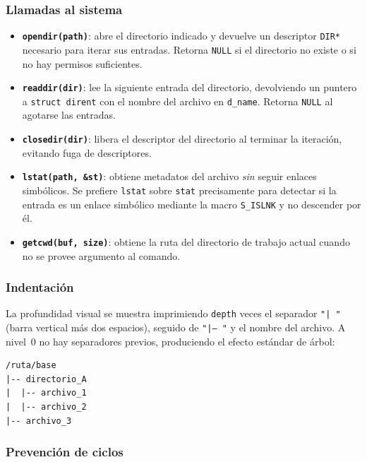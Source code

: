 \documentclass[11pt,a4paper]{article}
\begin{document}
\subsubsection*{Llamadas al sistema}

\begin{itemize}[leftmargin=*]
  \item \textbf{\texttt{opendir(path)}}: abre el directorio indicado y devuelve un descriptor \texttt{DIR*} necesario para iterar sus entradas. Retorna \texttt{NULL} si el directorio no existe o si no hay permisos suficientes.
  \item \textbf{\texttt{readdir(dir)}}: lee la siguiente entrada del directorio, devolviendo un puntero a \texttt{struct dirent} con el nombre del archivo en \texttt{d\_name}. Retorna \texttt{NULL} al agotarse las entradas.
  \item \textbf{\texttt{closedir(dir)}}: libera el descriptor del directorio al terminar la iteraci\'on, evitando fuga de descriptores.
  \item \textbf{\texttt{lstat(path, \&st)}}: obtiene metadatos del archivo \emph{sin} seguir enlaces simb\'olicos. Se prefiere \texttt{lstat} sobre \texttt{stat} precisamente para detectar si la entrada es un enlace simb\'olico mediante la macro \texttt{S\_ISLNK} y no descender por \'el.
  \item \textbf{\texttt{getcwd(buf, size)}}: obtiene la ruta del directorio de trabajo actual cuando no se provee argumento al comando.
\end{itemize}

\subsubsection*{Indentaci\'on}

La profundidad visual se muestra imprimiendo \texttt{depth} veces el separador \texttt{"|  "} (barra vertical m\'as dos espacios), seguido de \texttt{"|-- "} y el nombre del archivo. A nivel~0 no hay separadores previos, produciendo el efecto est\'andar de \'arbol:

\begin{lstlisting}[style=bashstyle]
/ruta/base
|-- directorio_A
|  |-- archivo_1
|  |-- archivo_2
|-- archivo_3
\end{lstlisting}

\subsubsection*{Prevenci\'on de ciclos}
\end{document}
